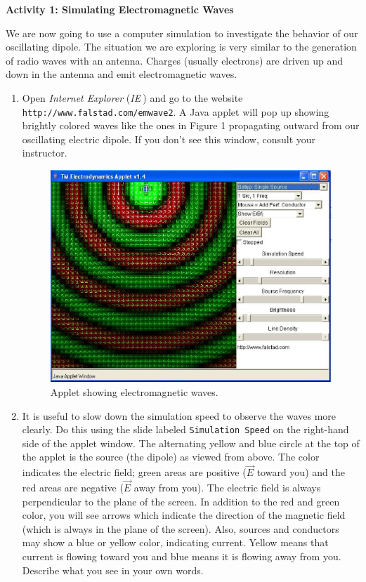 \textbf{Activity 1: Simulating Electromagnetic Waves}

We are now going to use a computer simulation to investigate the behavior of our oscillating dipole.
The situation we are exploring is very similar to the generation of radio waves with an antenna.
Charges (usually electrons) are driven up and down in the antenna and emit electromagnetic 
waves.

\begin{enumerate}

\item Open {\it Internet Explorer} ({\it IE$~$}) and go to the website
{\tt \verb!http://www.falstad.com/emwave2!}. A Java applet will pop up showing
brightly colored waves like the ones in Figure 1 propagating outward from our oscillating
electric dipole. 
If you don't see this window, consult your instructor.
\begin{figure}[hbt]
\begin{center}
\includegraphics[width=6.0in]{plane_waves/emwaves1.eps}
\caption{Applet showing electromagnetic waves.}
\end{center}
\end{figure}

\item It is useful to slow down the simulation speed to observe the waves more clearly.
Do this using the slide labeled
{\tt Simulation Speed} on the right-hand side of the applet window.
The alternating yellow and blue circle at the top of the applet is the source (the dipole)
as viewed from above.
The color indicates the electric field; green areas are positive 
($\vec E$ toward you) and the red areas are negative ($\vec E$ away from you). 
The electric field is always perpendicular to the plane of the screen.
In addition to the red and green color, you will see arrows which indicate the 
direction of the magnetic field (which is always in the plane of the screen).
Also, sources and conductors may show a blue or yellow color, indicating current. 
Yellow means that current is flowing toward you and blue means it is flowing away from you. 
Describe what you see in your own words.
\vspace{3.0cm}


\end{enumerate}
